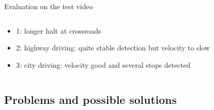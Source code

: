 \begin{frame}{Evaluation on the test video}
\begin{columns}[c]
\begin{column}{0.5\textwidth}
\begin{center}
			\end{center}
			\vspace{-0.5cm}
			\begin{itemize}
				\item 1: longer halt at crossroads
				\item 2: highway driving: quite stable detection but velocity to slow
				\item 3: city driving: velocity good and several stops detected
			\end{itemize}
		\end{column}
	\end{columns}
\end{frame}

\subsection{Problems and possible solutions}
